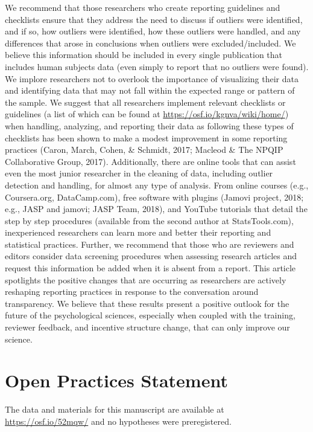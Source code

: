 \documentclass[english,,man]{apa6}
\theoremstyle{definition}
\theoremstyle{definition}
\theoremstyle{definition}
\theoremstyle{remark}
\begin{document}
We recommend that those researchers who create reporting guidelines and
checklists ensure that they address the need to discuss if outliers were
identified, and if so, how outliers were identified, how these outliers
were handled, and any differences that arose in conclusions when
outliers were excluded/included. We believe this information should be
included in every single publication that includes human subjects data
(even simply to report that no outliers were found). We implore
researchers not to overlook the importance of visualizing their data and
identifying data that may not fall within the expected range or pattern
of the sample. We suggest that all researchers implement relevant
checklists or guidelines (a list of which can be found at
\url{https://osf.io/kgnva/wiki/home/}) when handling, analyzing, and
reporting their data as following these types of checklists has been
shown to make a modest improvement in some reporting practices (Caron,
March, Cohen, \& Schmidt, 2017; Macleod \& The NPQIP Collaborative
Group, 2017). Additionally, there are online tools that can assist even
the most junior researcher in the cleaning of data, including outlier
detection and handling, for almost any type of analysis. From online
courses (e.g., Coursera.org, DataCamp.com), free software with plugins
(Jamovi project, 2018; e.g., JASP and jamovi; JASP Team, 2018), and
YouTube tutorials that detail the step by step procedures (available
from the second author at StatsTools.com), inexperienced researchers can
learn more and better their reporting and statistical practices.
Further, we recommend that those who are reviewers and editors consider
data screening procedures when assessing research articles and request
this information be added when it is absent from a report. This article
spotlights the positive changes that are occurring as researchers are
actively reshaping reporting practices in response to the conversation
around transparency. We believe that these results present a positive
outlook for the future of the psychological sciences, especially when
coupled with the training, reviewer feedback, and incentive structure
change, that can only improve our science.

\newpage

\section{Open Practices Statement}\label{open-practices-statement}

The data and materials for this manuscript are available at
\url{https://osf.io/52mqw/} and no hypotheses were preregistered.
\end{document}
